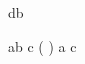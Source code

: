 \begin{eqcode}{d}{b}{}{}
   \lend
\end{eqcode}

\begin{eqcode}{a}{b}{}{}
  c \in ( \rightarrow {}) \lend
  a \gets c \lend %
\end{eqcode}
